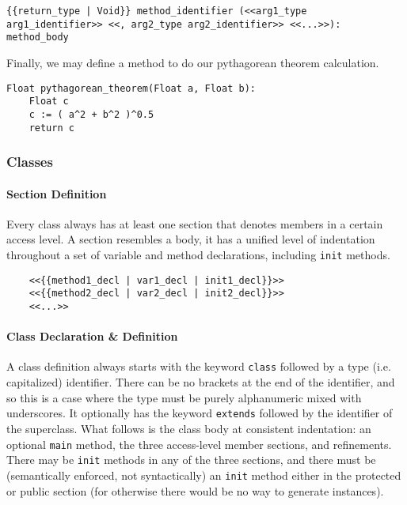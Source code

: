 \begin{lstlisting}
{{return_type | Void}} method_identifier (<<arg1_type arg1_identifier>> <<, arg2_type arg2_identifier>> <<...>>): method_body
\end{lstlisting}

Finally, we may define a method to do our pythagorean theorem calculation.

\begin{lstlisting}[backgroundcolor=\color{tintedorange},caption=Method Definition for the Pythagorean Theorem]
Float pythagorean_theorem(Float a, Float b):
    Float c
    c := ( a^2 + b^2 )^0.5
    return c
\end{lstlisting}

\subsubsection{Classes}

\paragraph{Section Definition}
Every class always has at least one section that denotes members in a certain access level. A section resembles a body, it has a unified level of indentation throughout a set of variable and method declarations, including \verb!init! methods.

\begin{lstlisting}
	<<{{method1_decl | var1_decl | init1_decl}}>>
	<<{{method2_decl | var2_decl | init2_decl}}>>
	<<...>>
\end{lstlisting}

\paragraph{Class Declaration \& Definition}
A class definition always starts with the keyword \verb!class! followed by a type (i.e. capitalized) identifier. There can be no brackets at the end of the identifier, and so this is a case where the type must be purely alphanumeric mixed with underscores. It optionally has the keyword \verb!extends! followed by the identifier of the superclass. What follows is the class body at consistent indentation: an optional \verb!main! method, the three access-level member sections, and refinements. There may be \verb!init! methods in any of the three sections, and there must be (semantically enforced, not syntactically) an \verb!init! method either in the protected or public section (for otherwise there would be no way to generate instances).

